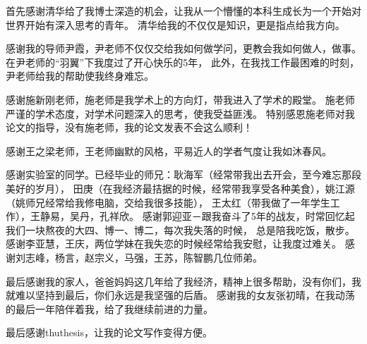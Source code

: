 
\begin{ack}
首先感谢清华给了我博士深造的机会，让我从一个懵懂的本科生成长为一个开始对世界开始有深入思考的青年。
清华给我的不仅仅是知识，更是指点给我方向。

感谢我的导师尹霞，尹老师不仅仅交给我如何做学问，更教会我如何做人，做事。
在尹老师的“羽翼”下我度过了开心快乐的5年，
此外，在我找工作最困难的时刻，尹老师给我的帮助使我终身难忘。

感谢施新刚老师，施老师是我学术上的方向灯，带我进入了学术的殿堂。
施老师严谨的学术态度，对学术问题深入的思考，使我受益匪浅。
特别感恩施老师对我论文的指导，没有施老师，我的论文发表不会这么顺利！

感谢王之梁老师，王老师幽默的风格，平易近人的学者气度让我如沐春风。

感谢实验室的同学。已经毕业的师兄：耿海军（经常带我出去开会，至今难忘那段美好的岁月），
田庚（在我经济最拮据的时候，经常带我享受各种美食），姚江源（姚师兄经常给我修电脑，交给我很多技能），
王太红（带我做了一年学生工作），王静易，吴丹，孔祥欣。
感谢郭迎亚－跟我奋斗了5年的战友，时常回忆起我们一块熬夜的大四、博一、博二，每次我失落的时候，
总是陪我吃饭，散步。
感谢李亚慧，王庆，两位学妹在我失恋的时候经常给我安慰，让我度过难关。
感谢刘志峰，杨言，赵宗义，马强，王苏，陈智鹏几位师弟。

最后感谢我的家人，爸爸妈妈这几年给了我经济，精神上很多帮助，没有你们，我就难以坚持到最后，你们永远是我坚强的后盾。
感谢我的女友张初晴，在我动荡的最后一年陪伴着我，给了我继续前进的力量。

最后感谢thuthesis，让我的论文写作变得方便。



\end{ack}
